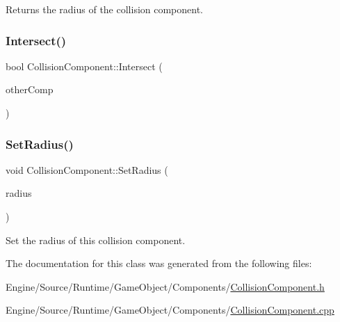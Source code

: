 Returns the radius of the collision component. \mbox{\label{class_collision_component_a612c1e5c553ef889ec5405bd236c4cef}} 
\subsubsection{\texorpdfstring{Intersect()}{Intersect()}}
{\footnotesize\ttfamily bool Collision\+Component\+::\+Intersect (\begin{DoxyParamCaption}\item[{const \mbox{\hyperlink{class_collision_component}{Collision\+Component}} \&}]{other\+Comp }\end{DoxyParamCaption})}

\mbox{\label{class_collision_component_a4bd86e9646160a141aed8a40704ad5fd}} 
\subsubsection{\texorpdfstring{Set\+Radius()}{SetRadius()}}
{\footnotesize\ttfamily void Collision\+Component\+::\+Set\+Radius (\begin{DoxyParamCaption}\item[{float}]{radius }\end{DoxyParamCaption})}

Set the radius of this collision component. 

The documentation for this class was generated from the following files\+:\begin{DoxyCompactItemize}
\item 
Engine/\+Source/\+Runtime/\+Game\+Object/\+Components/\mbox{\hyperlink{_collision_component_8h}{Collision\+Component.\+h}}\item 
Engine/\+Source/\+Runtime/\+Game\+Object/\+Components/\mbox{\hyperlink{_collision_component_8cpp}{Collision\+Component.\+cpp}}\end{DoxyCompactItemize}
